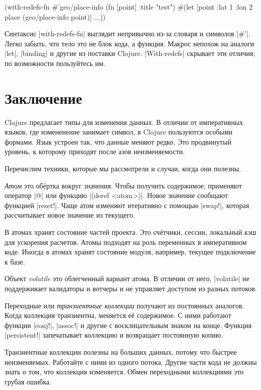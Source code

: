 \begin{english}
  \begin{clojure}
(with-redefs-fn
  {#'geo/place-info (fn [point] {:title "test"})}
  #(let [point {:lat 1 :lon 2}
         place (geo/place-info point)]
     ...))
  \end{clojure}
\end{english}

Синтаксис \spverb|with-redefs-fn| выглядит непривычно из-за словаря и символов
\spverb|#'|. Легко забыть, что тело это не блок кода, а функция. Макрос непохож
на аналоги \spverb|let|, \spverb|binding| и другие из поставки Clojure.
\spverb|With-redefs| скрывает эти отличия; по возможности пользуйтесь им.

\section{Заключение}

Clojure предлагает типы для изменения данных. В отличии от императивных языков,
где измененение занимает символ, в Clojure пользуются особыми формами. Язык
устроен так, что данные меняют редко. Это продвинутый уровень, к которому
приходят после азов неизменяемости.

Перечислим техники, которые мы рассмотрели и случаи, когда они полезны.

\emph{Атом} это об\"{е}ртка вокруг значения. Чтобы получить содержимое, применяют
оператор \spverb|@| или функцию \spverb|(deref <atom>)|. Новое значение сообщают
функцией \spverb|reset!|. Чаще атом изменяют итеративно с помощью
\spverb|swap!|, которая рассчитывает новое значение из текущего.

В атомах хранят состояние частей проекта. Это сч\"{е}тчики, сессии, локальный кэш
для ускорения расчетов. Атомы подходят на роль переменных в императивном
коде. Иногда в атомах хранят состояние модуля, например, текущее подключение к
базе.

Объект \emph{volatile} это облегченный вариант атома. В отличии от него,
\spverb|volatile| не поддерживает валидаторы и вотчеры и не управляет доступом
из разных потоков.

Переходные или \emph{транзиентные коллекции} получают из постоянных
аналогов. Когда коллекция транзиентна, меняется е\"{е} содержимое. С ними работают
функции \spverb|conj!|, \spverb|assoc!| и другие с восклицательным знаком на
конце. Функция \spverb|persistent!| запечатывает коллекцию и возвращает
постоянную копию.

Транзиентные коллекции полезны на больших данных, потому что быстрее
неизменяемых. Работайте с ними из одного потока. Другие части кода не должны
знать о том, что коллекция изменяется. Обмен переходными коллекциями это грубая
ошибка.

